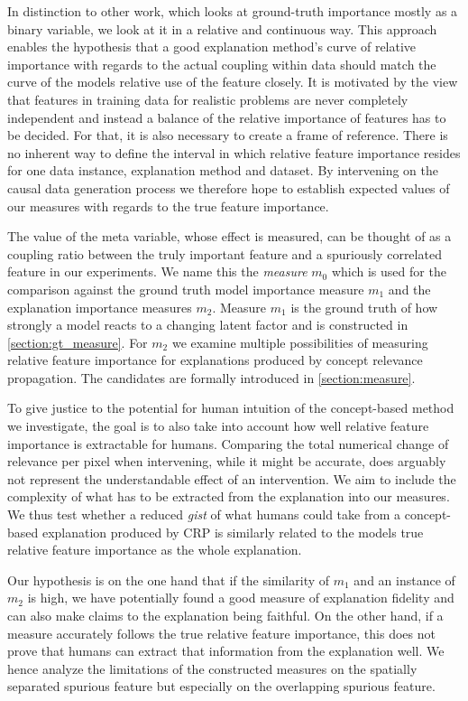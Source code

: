 In distinction to other work, which looks at ground-truth importance mostly as a binary variable, we look at it in a relative and continuous way. This approach enables the hypothesis that a good explanation method's curve of relative importance with regards to the actual coupling within data should match the curve of the models relative use of the feature closely. It is motivated by the view that features in training data for realistic problems are never completely independent and instead a balance of the relative importance of features has to be decided. For that, it is also necessary to create a frame of reference. There is no inherent way to define the interval in which relative feature importance resides for one data instance, explanation method and dataset. By intervening on the causal data generation process we therefore hope to establish expected values of our measures with regards to the true feature importance.

The value of the meta variable, whose effect is measured, can be thought of as a coupling ratio between the truly important feature and a spuriously correlated feature in our experiments. We name this the \textit{measure} $m_0$ which is used for the comparison against the ground truth model importance measure $m_1$ and the explanation importance measures $m_2$. Measure $m_1$ is the ground truth of how strongly a model reacts to a changing latent factor and is constructed in \cref{section:gt_measure}. For $m_2$ we examine multiple possibilities of measuring relative feature importance for explanations produced by concept relevance propagation. The candidates are formally introduced in \autoref{section:measure}. 

To give justice to the potential for human intuition of the concept-based method we investigate, the goal is to also take into account how well relative feature importance is extractable for humans. Comparing the total numerical change of relevance per pixel when intervening, while it might be accurate, does arguably not represent the understandable effect of an intervention. We aim to include the complexity of what has to be extracted from the explanation into our measures. We thus test whether a reduced \textit{gist} of what humans could take from a concept-based explanation produced by CRP is similarly related to the models true relative feature importance as the whole explanation. 

Our hypothesis is on the one hand that if the similarity of $m_1$ and an instance of $m_2$ is high, we have potentially found a good measure of explanation fidelity and can also make claims to the explanation being faithful. On the other hand, if a measure accurately follows the true relative feature importance, this does not prove that humans can extract that information from the explanation well. We hence analyze the limitations of the constructed measures on the spatially separated spurious feature but especially on the overlapping spurious feature. 


